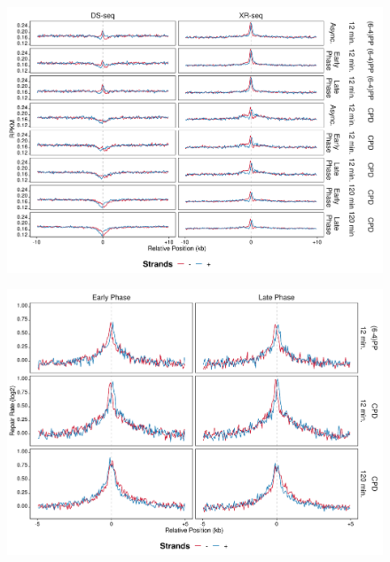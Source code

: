 \begin{figure}[H]
\begin{center}
\includegraphics[width=\textwidth]{Chapters/7_appendix/figures/supfig49}
\caption[]{}
\label{supfig:}
\end{center}
\end{figure}

\begin{figure}[H]
\begin{center}
\includegraphics[width=\textwidth]{Chapters/7_appendix/figures/supfig50}
\caption[]{}
\label{supfig:}
\end{center}
\end{figure}

